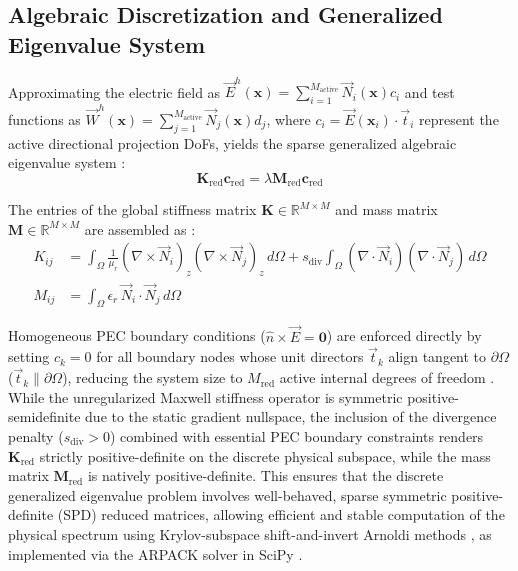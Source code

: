 \documentclass[preprint,12pt]{elsarticle}
\begin{document}
\subsection{Algebraic Discretization and Generalized Eigenvalue System}
\label{subsec:algebraic_system}

Approximating the electric field as $\vec{E}^h(\mathbf{x}) = \sum_{i=1}^{M_{\mathrm{active}}} \vec{N}_i(\mathbf{x}) c_i$ and test functions as $\vec{W}^h(\mathbf{x}) = \sum_{j=1}^{M_{\mathrm{active}}} \vec{N}_j(\mathbf{x}) d_j$, where $c_i = \vec{E}(\mathbf{x}_i) \cdot \vec{t}_i$ represent the active directional projection DoFs, yields the sparse generalized algebraic eigenvalue system \cite{ortiz2023tese, goncalves2025tese}:
\begin{equation}
\mathbf{K}_{\mathrm{red}} \mathbf{c}_{\mathrm{red}} = \lambda \mathbf{M}_{\mathrm{red}} \mathbf{c}_{\mathrm{red}}
\label{eq:generalized_eigenvalue_system}
\end{equation}

The entries of the global stiffness matrix $\mathbf{K} \in \mathbb{R}^{M \times M}$ and mass matrix $\mathbf{M} \in \mathbb{R}^{M \times M}$ are assembled as \cite{goncalves2025tese}:
\begin{align}
K_{ij} &= \int_{\Omega} \frac{1}{\mu_r} (\nabla \times \vec{N}_i)_z (\nabla \times \vec{N}_j)_z \, d\Omega + s_{\mathrm{div}} \int_{\Omega} (\nabla \cdot \vec{N}_i)(\nabla \cdot \vec{N}_j) \, d\Omega \label{eq:stiffness_matrix_entry} \\
M_{ij} &= \int_{\Omega} \epsilon_r \, \vec{N}_i \cdot \vec{N}_j \, d\Omega \label{eq:mass_matrix_entry}
\end{align}

Homogeneous PEC boundary conditions ($\hat{n} \times \vec{E} = \mathbf{0}$) are enforced directly by setting $c_k = 0$ for all boundary nodes whose unit directors $\vec{t}_k$ align tangent to $\partial\Omega$ ($\vec{t}_k \parallel \partial\Omega$), reducing the system size to $M_{\mathrm{red}}$ active internal degrees of freedom \cite{ortiz2021nodal, goncalves2025tese}. While the unregularized Maxwell stiffness operator is symmetric positive-semidefinite due to the static gradient nullspace, the inclusion of the divergence penalty ($s_{\mathrm{div}} > 0$) combined with essential PEC boundary constraints renders $\mathbf{K}_{\mathrm{red}}$ strictly positive-definite on the discrete physical subspace, while the mass matrix $\mathbf{M}_{\mathrm{red}}$ is natively positive-definite. This ensures that the discrete generalized eigenvalue problem involves well-behaved, sparse symmetric positive-definite (SPD) reduced matrices, allowing efficient and stable computation of the physical spectrum using Krylov-subspace shift-and-invert Arnoldi methods \cite{saad2011numerical, lehoucq1998arpack}, as implemented via the ARPACK solver in SciPy \cite{virtanen2020scipy}.
\end{document}
